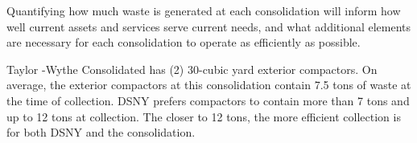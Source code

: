 
    Quantifying how much waste is generated at each consolidation will inform how well current assets and services serve current needs, and what additional elements are necessary for each consolidation to operate as efficiently as possible.
    
    Taylor -Wythe  Consolidated has (2) 30-cubic yard exterior compactors. On average, the exterior compactors at this consolidation contain 7.5 tons of waste at the time of collection. DSNY prefers compactors to contain more than 7 tons and up to 12 tons at collection. The closer to 12 tons, the more efficient collection is for both DSNY and the consolidation.